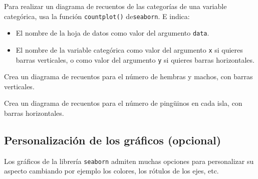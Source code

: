 \documentclass[
  a4paper,
  noprof,
  12pt,
  notoc,
  nosols,
  nobib]{mnye}
\providecommand{\tightlist}{%
  \setlength{\itemsep}{0pt}\setlength{\parskip}{0pt}}\usepackage{longtable,booktabs,array}
\renewenvironment{exercise}[1][]{
            \if\relax\detokenize{#1}\relax
                \ex
            \else
                \ex[note={#1}]
            \fi
        }{\endex}
\theoremstyle{definition}
\newtheorem{exercise}{Ejercicio}[section]
\theoremstyle{remark}
\begin{document}
\begin{tcolorbox}[enhanced jigsaw, bottomrule=.15mm, colframe=quarto-callout-note-color-frame, toprule=.15mm, leftrule=.75mm, breakable, left=2mm, arc=.35mm, rightrule=.15mm, colback=white, opacityback=0]
\begin{minipage}[t]{5.5mm}
\textcolor{quarto-callout-note-color}{\faInfo}
\end{minipage}%
\begin{minipage}[t]{\textwidth - 5.5mm}

Para realizar un diagrama de recuentos de las categorías de una variable
categórica, usa la función \texttt{countplot()} de\texttt{seaborn}. E
indica:

\begin{itemize}
\tightlist
\item
  El nombre de la hoja de datos como valor del argumento \texttt{data}.
\item
  El nombre de la variable categórica como valor del argumento
  \texttt{x} si quieres barras verticales, o como valor del argumento
  \texttt{y} si quieres barras horizontales.
\end{itemize}

\end{minipage}%
\end{tcolorbox}

\begin{exercise}[]%
\protect\hypertarget{exr-1categorial-countplot-vertical}{}\label{exr-1categorial-countplot-vertical}%
Crea un diagrama de recuentos para el número de hembras y machos, con
barras verticales.

\end{exercise}

\begin{exercise}[]%
\protect\hypertarget{exr-1categorial-sns-countplot}{}\label{exr-1categorial-sns-countplot}%
Crea un diagrama de recuentos para el número de pingüinos en cada isla,
con barras horizontales.

\end{exercise}

\subsection{Personalización de los gráficos
(opcional)}\label{personalizaciuxf3n-de-los-gruxe1ficos-opcional}

Los gráficos de la librería \texttt{seaborn} admiten muchas opciones
para personalizar su aspecto cambiando por ejemplo los colores, los
rótulos de los ejes, etc.
\end{document}
